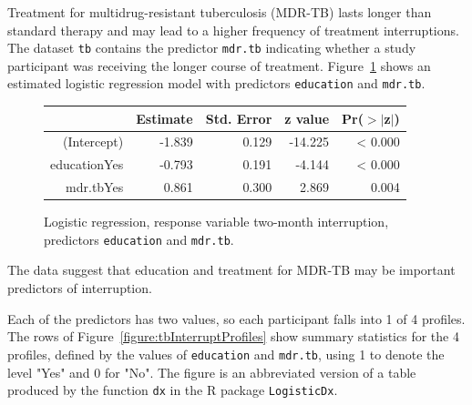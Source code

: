 Treatment for multidrug-resistant tuberculosis (MDR-TB) lasts longer than standard therapy and may lead to a higher frequency of treatment interruptions.  The dataset \texttt{tb} contains the predictor \texttt{mdr.tb} indicating whether a study participant was receiving the longer course of treatment.  Figure~\ref{treatmentInterruptEducMdrLogreg} shows an estimated logistic regression model with predictors \texttt{education} and \texttt{mdr.tb}.

\begin{figure}[ht]
\centering
\begin{tabular}{rrrrr}
  \hline
 & Estimate & Std. Error & z value & Pr($>$$|$z$|$) \\
  \hline
(Intercept) & -1.839 & 0.129 & -14.225 & < 0.000 \\
  educationYes & -0.793 & 0.191 & -4.144 & < 0.000 \\
  mdr.tbYes & 0.861 & 0.300 & 2.869 & 0.004 \\
   \hline
\end{tabular}
\caption{Logistic regression, response variable two-month interruption,
       predictors \texttt{education} and \texttt{mdr.tb}.}
\label{treatmentInterruptEducMdrLogreg}
\end{figure}
The data suggest that education and treatment for MDR-TB may be important predictors of interruption.

Each of the predictors has two values, so each participant falls into 1 of 4 profiles.  The rows of Figure~\ref{figure:tbInterruptProfiles} show summary statistics for the 4 profiles, defined by the values of \texttt{education} and \texttt{mdr.tb}, using 1 to denote the level "Yes" and 0 for "No". The figure is an abbreviated version of a table produced by the function \texttt{dx} in the \textsf{R} package \texttt{LogisticDx}.

